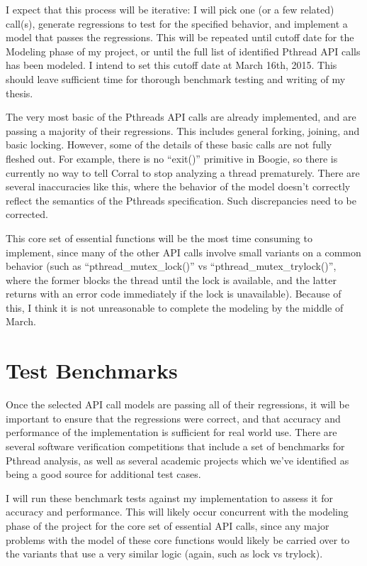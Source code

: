 I expect that this process will be iterative: I will pick one (or a few related) call(s), generate regressions to test for the specified behavior, and implement a model that passes the regressions.  This will be repeated until cutoff date for the Modeling phase of my project, or until the full list of identified Pthread API calls has been modeled.  I intend to set this cutoff date at March 16th, 2015.  This should leave sufficient time for thorough benchmark testing and writing of my thesis.

The very most basic of the Pthreads API calls are already implemented, and are passing a majority of their regressions.  This includes general forking, joining, and basic locking.  However, some of the details of these basic calls are not fully fleshed out.  For example, there is no ``exit()'' primitive in Boogie, so there is currently no way to tell Corral to stop analyzing a thread prematurely.  There are several inaccuracies like this, where the behavior of the model doesn't correctly reflect the semantics of the Pthreads specification.  Such discrepancies need to be corrected.

This core set of essential functions will be the most time consuming to implement, since many of the other API calls involve small variants on a common behavior (such as ``pthread\_mutex\_lock()'' vs ``pthread\_mutex\_trylock()'', where the former blocks the thread until the lock is available, and the latter returns with an error code immediately if the lock is unavailable).  Because of this, I think it is not unreasonable to complete the modeling by the middle of March.

\section{Test Benchmarks}
Once the selected API call models are passing all of their regressions, it will be important to ensure that the regressions were correct, and that accuracy and performance of the implementation is sufficient for real world use.  There are several software verification competitions that include a set of benchmarks for Pthread analysis, as well as several academic projects which we've identified as being a good source for additional test cases.

I will run these benchmark tests against my implementation to assess it for accuracy and performance.  This will likely occur concurrent with the modeling phase of the project for the core set of essential API calls, since any major problems with the model of these core functions would likely be carried over to the variants that use a very similar logic (again, such as lock vs trylock).

